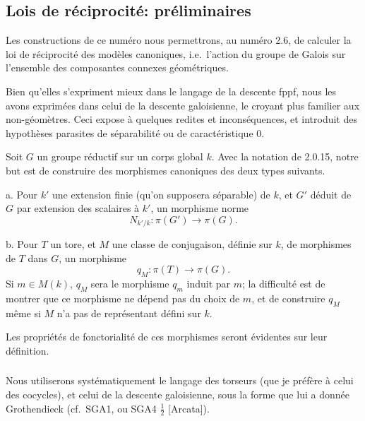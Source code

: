 \documentclass[12pt,a4paper]{article}
\theoremstyle{plain}
\theoremstyle{definition}
\theoremstyle{remark}
\begin{document}
\subsection{Lois de r\'eciprocit\'e: pr\'eliminaires}

Les constructions de ce num\'ero nous permettrons, au num\'ero 2.6, de calculer la loi de r\'eciprocit\'e des mod\`eles canoniques, i.e.~l'action du groupe de Galois sur l'ensemble des composantes connexes g\'eom\'etriques.

Bien qu'elles s'expriment mieux dans le langage de la descente fppf, nous les avons exprim\'ees dans celui de la descente galoisienne, le croyant plus familier aux non-g\'eom\`etres. Ceci expose \`a quelques redites et incons\'equences, et introduit des hypoth\`eses parasites de s\'eparabilit\'e ou de caract\'eristique 0.

Soit $G$ un groupe r\'eductif sur un corps global $k$. Avec la notation de 2.0.15, notre but est de construire des morphismes canoniques des deux types suivants.

a. Pour $k'$ une extension finie (qu'on supposera s\'eparable) de $k$, et $G'$ d\'eduit de $G$ par extension des scalaires \`a $k'$, un morphisme norme
\begin{equation}\label{eq:2.4.0.1}
N_{k'/k}: \pi(G') \to \pi(G).
\end{equation}

b. Pour $T$ un tore, et $M$ une classe de conjugaison, d\'efinie sur $k$, de morphismes de $T$ dans $G$, un morphisme
\begin{equation}\label{eq:2.4.0.2}
q_M: \pi(T) \to \pi(G).
\end{equation}
Si $m \in M(k)$, $q_M$ sera le morphisme $q_m$ induit par $m$; la difficult\'e est de montrer que ce morphisme ne d\'epend pas du choix de $m$, et de construire $q_M$ m\^eme si $M$ n'a pas de repr\'esentant d\'efini sur $k$.

Les propri\'et\'es de fonctorialit\'e de ces morphismes seront \'evidentes sur leur d\'efinition.

\subsubsection{}

Nous utiliserons syst\'ematiquement le langage des torseurs (que je pr\'ef\`ere \`a celui des cocycles), et celui de la descente galoisienne, sous la forme que lui a donn\'ee Grothendieck (cf.~SGA1, ou SGA4 $\frac{1}{2}$ [Arcata]).
\end{document}

